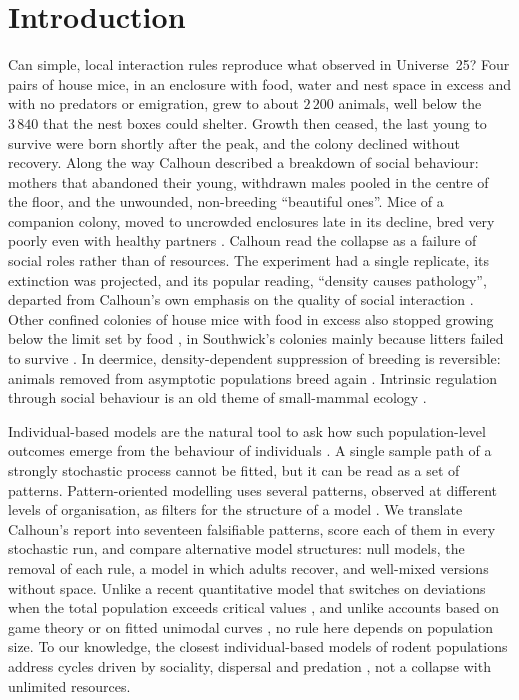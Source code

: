 \section{Introduction}
\label{sec:intro}

Can simple, local interaction rules reproduce what \citet{Calhoun1973} observed in Universe~25? Four pairs of
house mice, in an enclosure with food, water and nest space in excess and with no predators or emigration, grew to
about $2\,200$ animals, well below the $3\,840$ that the nest boxes could shelter. Growth then ceased, the last
young to survive were born shortly after the peak, and the colony declined without recovery. Along the way Calhoun
described a breakdown of social behaviour: mothers that abandoned their young, withdrawn males pooled in the centre
of the floor, and the unwounded, non-breeding ``beautiful ones''. Mice of a companion colony, moved to uncrowded
enclosures late in its decline, bred very poorly even with healthy partners \citep{Marsden1972}. Calhoun read the
collapse as a failure of social roles rather than of resources. The experiment had a single replicate, its
extinction was projected, and its popular reading, ``density causes pathology'', departed from Calhoun's own
emphasis on the quality of social interaction \citep{RamsdenAdams2009}. Other confined colonies of
house mice with food in excess also stopped growing below the limit set by food
\citep{Southwick1955a,CrowcroftRowe1957}, in Southwick's colonies mainly because litters failed to survive
\citep{Southwick1955}. In deermice, density-dependent suppression of breeding is reversible: animals removed from
asymptotic populations breed again \citep{Terman1973}. Intrinsic regulation through social behaviour is an old theme of
small-mammal ecology \citep{Christian1950,Chitty1967}.

Individual-based models are the natural tool to ask how such population-level outcomes emerge from the behaviour of
individuals \citep{RailsbackGrimm2019}. A single sample path of a strongly stochastic process cannot be
fitted, but it can be read as a set of patterns. Pattern-oriented modelling uses several patterns, observed at
different levels of organisation, as filters for the structure of a model
\citep{Grimm2005}. We translate Calhoun's report into seventeen
falsifiable patterns, score each of them in every stochastic run, and compare alternative model structures: null
models, the removal of each rule, a model in which adults recover, and well-mixed versions without space. Unlike a recent quantitative model that
switches on deviations when the total population exceeds critical values \citep{GwizdallaDus2026}, and unlike
accounts based on game theory \citep{Mantzaris2025} or on fitted unimodal curves \citep{Roman2025}, no rule here
depends on population size. To our knowledge, the closest individual-based models of rodent populations address
cycles driven by sociality, dispersal and predation \citep{Radchuk2016}, not a collapse with unlimited resources.

